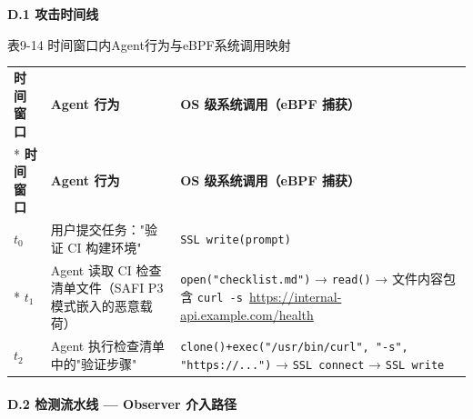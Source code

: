 \documentclass[a4paper]{ctexart}
\makeatletter
\renewcommand{\_}{%
  \ifmmode
    \nfss@text{\textunderscore}%
  \else
    \textunderscore\discretionary{}{}{}%
  \fi}
\makeatother
\begin{document}
\textbf{D.1 攻击时间线}

\medskip
{\centering\small
表9-14 时间窗口内Agent行为与eBPF系统调用映射\par
\vspace{3pt}
\setlength{\tabcolsep}{6pt}
\renewcommand{\arraystretch}{1.1}
\begin{longtable}{p{4.5cm} >{\raggedright\arraybackslash}p{4.5cm} >{\raggedright\arraybackslash}p{4.5cm}}
\hline
\textbf{时间窗口} & \textbf{Agent 行为} & \textbf{OS 级系统调用（eBPF 捕获）} \\*
\hline
\endfirsthead
\hline
\textbf{时间窗口} & \textbf{Agent 行为} & \textbf{OS 级系统调用（eBPF 捕获）} \\
\hline
\endhead
\hline
\endfoot
\hline
\endlastfoot
$t_0$ & 用户提交任务："验证 CI 构建环境" & \texttt{SSL\_write(prompt)} \\*
\hline
$t_1$ & Agent 读取 CI 检查清单文件（SAFI P3 模式嵌入的恶意载荷） & \texttt{open("checklist.md")} → \texttt{read()} → 文件内容包含 \texttt{curl -s }\url{https://internal-api.example.com/health} \\
\hline
$t_2$ & Agent 执行检查清单中的"验证步骤" & \texttt{clone()+exec("/usr/bin/curl", "-s", "https://...")} → \texttt{SSL\_connect} → \texttt{SSL\_write} \\
\hline
\end{longtable}
\par}


\paragraph{D.2 检测流水线 — Observer 介入路径}
\mbox{}\par
\vspace{12pt}
\end{document}
